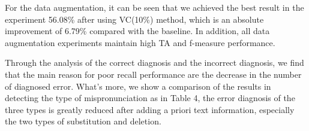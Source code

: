 \documentclass[a4paper]{article}
\begin{document}


For the data augmentation, it can be seen that we achieved the best result in the experiment 56.08\% after using VC(10\%) method, which is an absolute improvement of 6.79\% compared with the baseline. In addition, all data augmentation experiments maintain high TA and f-measure performance. 

Through the analysis of the correct diagnosis and the incorrect diagnosis, we find that the main reason for poor recall performance are the decrease in the number of diagnosed error. What's more, we show a comparison of the results in detecting the type of mispronunciation as in Table 4, the error diagnosis of the three types is greatly reduced after adding a priori text information, especially the two types of substitution and deletion.
\end{document}
